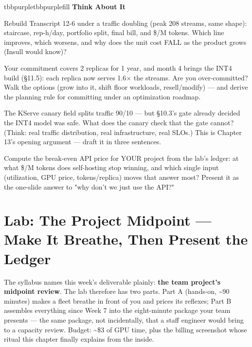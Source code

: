 \begin{calloutbox}{tbbpurple}{tbbpurplefill}
{\normalsize\bfseries\color{tbbpurple}Think About It}\par\vspace{3pt}
\begin{tbbitemize}
  \item Rebuild Transcript 12-6 under a traffic doubling (peak 208 streams, same shape): staircase, rep-h/day, portfolio split, final bill, and \$/M tokens. Which line improves, which worsens, and why does the unit cost FALL as the product grows (Insull would know)?
  \item Your commitment covers 2 replicas for 1 year, and month 4 brings the INT4 build (§11.5): each replica now serves 1.6× the streams. Are you over-committed? Walk the options (grow into it, shift floor workloads, resell/modify) — and derive the planning rule for committing under an optimization roadmap.
  \item The KServe canary field splits traffic 90/10 — but §10.3's gate already decided the INT4 model was safe. What does the canary check that the gate cannot? (Think: real traffic distribution, real infrastructure, real SLOs.) This is Chapter 13's opening argument — draft it in three sentences.
  \item Compute the break-even API price for YOUR project from the lab's ledger: at what \$/M tokens does self-hosting stop winning, and which single input (utilization, GPU price, tokens/replica) moves that answer most? Present it as the one-slide answer to "why don't we just use the API?"
\end{tbbitemize}
\end{calloutbox}

\section{Lab: The Project Midpoint — Make It Breathe, Then Present the Ledger}

The syllabus names this week's deliverable plainly: \textbf{the team project's midpoint review}. The lab therefore has two parts. Part A (hands-on, \textasciitilde{}90 minutes) makes a fleet breathe in front of you and prices its reflexes; Part B assembles everything since Week 7 into the eight-minute package your team presents — the same package, not incidentally, that a staff engineer would bring to a capacity review. Budget: \textasciitilde{}\$3 of GPU time, plus the billing screenshot whose ritual this chapter finally explains from the inside.

